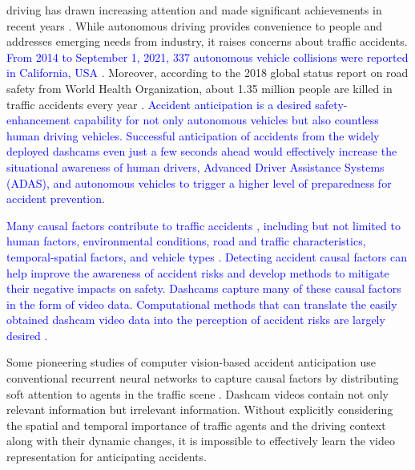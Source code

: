 \documentclass[journal]{IEEEtran}
\begin{document}
 driving has drawn increasing attention and made significant achievements in recent years  \cite{eskandarian2019research, muhammad2020deep}. While autonomous driving provides convenience to people and addresses emerging needs from industry, it raises concerns about traffic accidents. \textcolor{blue}{From 2014 to September 1, 2021, 337 autonomous vehicle collisions were reported in California, USA \cite{ca_dmv_2021}}. Moreover, according to the 2018 global status report on road safety from World Health Organization, about 1.35 million people are killed in traffic accidents every year \cite{world2018global}. \textcolor{blue}{Accident anticipation is a desired safety-enhancement capability for not only autonomous vehicles but also countless human driving vehicles. Successful anticipation of accidents from the widely deployed dashcams even just a few seconds ahead would effectively increase the situational awareness of human drivers, Advanced Driver Assistance Systems (ADAS), and autonomous vehicles to trigger a higher level of preparedness for accident prevention}. 


\textcolor{blue}{
Many causal factors contribute to traffic accidents \cite{li2021crash}, including but not limited to human factors, environmental conditions, road and traffic characteristics, temporal-spatial factors, and vehicle types \cite{singh2015critical}. Detecting accident causal factors can help improve the awareness of accident risks and develop methods to mitigate their negative impacts on safety. Dashcams capture many of these causal factors in the form of video data. Computational methods that can translate the easily obtained dashcam video data into the perception of accident risks are largely desired \cite{janai2020computer}.}

Some pioneering studies of computer vision-based accident anticipation use conventional recurrent neural networks to capture causal factors by distributing soft attention to agents in the traffic scene \cite{chan2016anticipating,zeng2017agent, suzuki2018anticipating,fatima2021global}. Dashcam videos contain not only relevant information but irrelevant information. Without explicitly considering the spatial and temporal importance of traffic agents and the driving context along with their dynamic changes, it is impossible to effectively learn the video representation for  anticipating accidents. 
\end{document}
